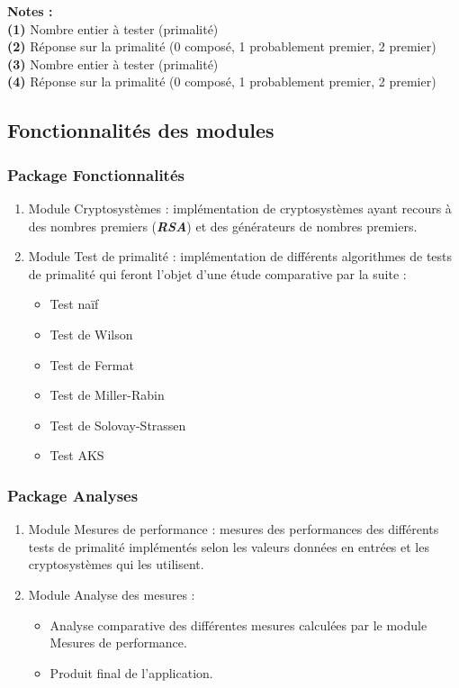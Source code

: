 	\vspace{1em}
	\hspace{-1.3em}\textbf{Notes :}\\
		\textbf{(1)} Nombre entier à tester (primalité)\\
		\textbf{(2)} Réponse sur la primalité (0 composé, 1 probablement premier, 2 premier)\\
		\textbf{(3)} Nombre entier à tester (primalité)\\
		\textbf{(4)} Réponse sur la primalité (0 composé, 1 probablement premier, 2 premier)\\
		
	
	\subsection{Fonctionnalités des modules}
		\subsubsection*{Package Fonctionnalités}
			\begin{enumerate}[leftmargin=*]
				\item Module Cryptosystèmes : implémentation de cryptosystèmes ayant recours à des nombres premiers (\textbf{\textit{RSA}}) et des générateurs de nombres premiers.
				\item Module Test de primalité : implémentation de différents algorithmes de tests de primalité qui feront l'objet d'une étude comparative par la suite :
				\begin{itemize}
					\item Test naïf
					\item Test de Wilson
					\item Test de Fermat
					\item Test de Miller-Rabin
					\item Test de Solovay-Strassen
					\item Test AKS
				\end{itemize}
			\end{enumerate}
			
			\subsubsection*{Package Analyses}
			\begin{enumerate}[leftmargin=*]
				\item Module Mesures de performance : mesures des performances des différents tests de primalité implémentés selon les valeurs données en entrées et les cryptosystèmes qui les utilisent.
				\item Module Analyse des mesures :
				\begin{itemize}[leftmargin=0.2cm]
					\item Analyse comparative des différentes mesures calculées par le module Mesures de performance.
					\item Produit final de l'application.
				\end{itemize}
			\end{enumerate}
	

